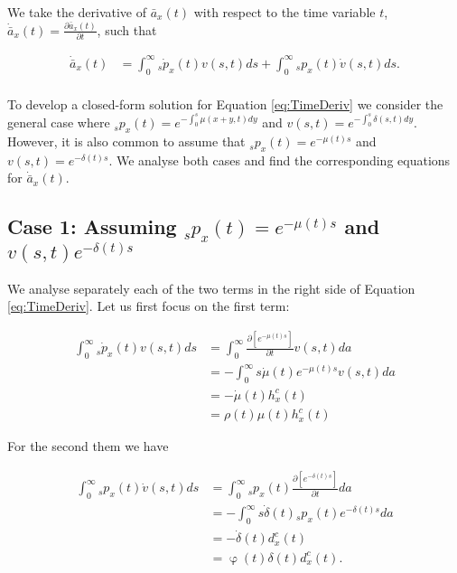 \documentclass[12pt]{article}
\begin{document}
We take the derivative of $\bar{a}_x(t)$ with respect to the time variable $t$, $\dot{\bar{a}} _x(t)=\frac{\partial \bar{a}_x(t)}{\partial t}$, such that

\begin{equation}\label{eq:TimeDeriv}
\begin{split}
\dot{\bar{a}} _x(t) &= \int_0^\infty {}_s\dot{p}_x(t) v(s,t)ds +\int_0^\infty {}_sp_x(t) \dot{v}(s,t)ds.\\
\end{split}
\end{equation}


To develop a closed-form solution for Equation \ref{eq:TimeDeriv} we consider the general case where $_sp_x(t)=e^{-\int_{0}^{s}\mu(x+y,t)dy}$ and ${v}(s,t)=e^{-\int_{0}^{s}\delta(s,t)dy}$. However, it is also common to assume that ${}_sp_x(t)=e^{-\mu(t)s}$ and $v(s,t)=e^{-\delta(t)s}$. We analyse both cases and find the corresponding equations for $\dot{\bar{a}} _x(t)$.




\subsection{Case 1: Assuming ${}_sp_x(t)=e^{-\mu(t)s}$ and $v(s,t)e^{-\delta(t)s}$}


We analyse separately each of the two terms in the right side of Equation \ref{eq:TimeDeriv}. Let us first focus on the first term:

\begin{equation}\label{eq:TimeDerivC1}
\begin{split}
\int_0^\infty {}_s\dot{p}_x(t) v(s,t)ds &=\int_0^\infty \frac{\partial \left[ e^{-\mu(t)s} \right]}{\partial t}v(s,t)da \\
&=-\int_0^\infty s \dot{\mu}(t) e^{-\mu(t)s} v(s,t)da \\
&=-  \dot{\mu}(t)  h^{c}_x(t) \\
&=\rho(t) \mu(t)  h^{c}_x(t) 
\end{split}
\end{equation}


For the second them we have

\begin{equation}\label{eq:TimeDerivC2}
\begin{split}
\int_0^\infty {}_s{p}_x(t) \dot{v}(s,t)ds &=\int_0^\infty {}_s{p}_x(t) \frac{\partial \left[ e^{-\delta(t)s} \right]}{\partial t}da \\
&=-\int_0^\infty s \dot{\delta}(t) {}_s{p}_x(t) e^{-\delta(t)s} da \\
&=-  \dot{\delta}(t)  d^{c}_x(t) \\
&= \upvarphi(t)\delta(t)  d^{c}_x(t).
\end{split}
\end{equation}
\end{document}
